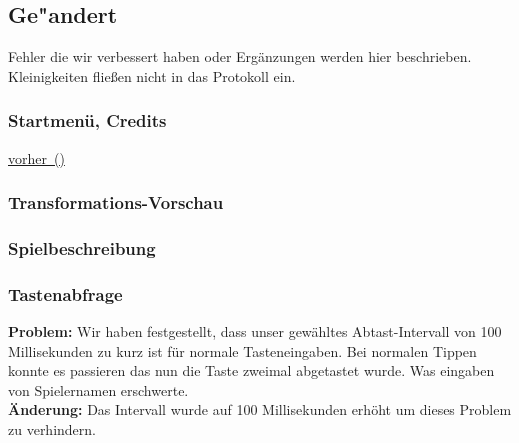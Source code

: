 %



\subsection{Ge{"a}ndert}
\label{Abschnitt:Aenderungen:Protokoll:Behobene_Probleme}

Fehler die wir verbessert haben oder Ergänzungen werden hier beschrieben. Kleinigkeiten fließen nicht in das Protokoll ein.\\





\subsubsection*{Startmenü, Credits}
\label{Abschnitt:Aenderungen:Protokoll:Startmenue}


\hyperref[Abb:Aenderungen:Startmenue_(vorher)]{vorher~(\mousecursor)}





\subsubsection*{Transformations-Vorschau}








\subsubsection*{Spielbeschreibung}











\subsubsection*{Tastenabfrage}
\textbf{Problem:}
Wir haben festgestellt, dass unser gewähltes Abtast-Intervall von 100 Millisekunden zu kurz ist für normale Tasteneingaben. Bei normalen Tippen konnte es passieren das nun die Taste zweimal abgetastet wurde. Was eingaben von Spielernamen erschwerte. \\
\textbf{Änderung:} Das Intervall wurde auf 100 Millisekunden erhöht um dieses Problem zu verhindern.

